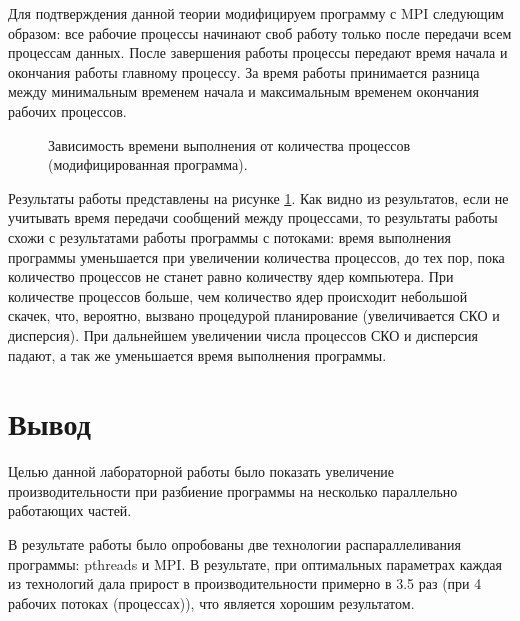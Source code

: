 \documentclass[12pt,a4paper]{report}
\begin{document}
				Для подтверждения данной теории модифицируем программу с MPI следующим 
				образом: все рабочие процессы начинают своб работу только после 
				передачи всем процессам данных.
				После завершения работы процессы передают время начала и окончания 
				работы главному процессу.
				За время работы принимается разница между минимальным временем начала и 
				максимальным временем окончания рабочих процессов.
				
				\begin{figure}[h]
					\caption{Зависимость времени выполнения от количества процессов 
					(модифицированная программа).}
					\label{ris:mpiMod}
				\end{figure}
			
			Результаты работы представлены на рисунке \ref{ris:mpiMod}.
			Как видно из результатов, если не учитывать время передачи сообщений 
			между процессами, то результаты работы схожи с результатами работы 
			программы с потоками: время выполнения программы уменьшается при 
			увеличении количества процессов, до тех пор, пока количество процессов не 
			станет равно количеству ядер компьютера.
			При количестве процессов больше, чем количество ядер происходит небольшой 
			скачек, что, вероятно, вызвано процедурой планирование (увеличивается СКО 
			и дисперсия).
			При дальнейшем увеличении числа процессов СКО и дисперсия падают, а так 
			же уменьшается время выполнения программы.
			\section{Вывод}
			
				Целью данной лабораторной работы было показать увеличение 
				производительности при разбиение программы на несколько параллельно 
				работающих частей.
				
				В результате работы было опробованы две технологии распараллеливания 
				программы: pthreads и MPI. В результате, при оптимальных параметрах 
				каждая из технологий дала прирост в производительности примерно в 3.5 
				раз (при 4 рабочих потоках (процессах)), что является хорошим 
				результатом.
				
\end{document}
